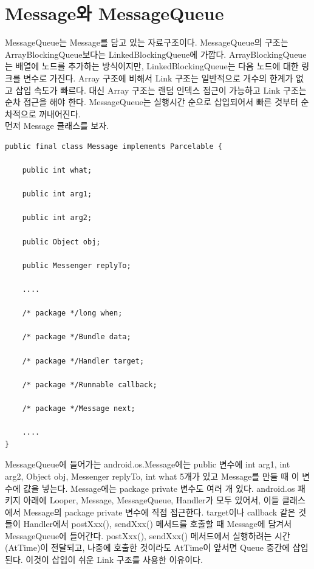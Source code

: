 \section{Message와 MessageQueue}
\label{sec:messagequeue}
MessageQueue는 Message를 담고 있는 자료구조이다.
MessageQueue의 구조는 ArrayBlockingQueue보다는 LinkedBlockingQueue에 가깝다. ArrayBlockingQueue는 배열에 노드를 추가하는 방식이지만, LinkedBlockingQueue는 다음 노드에 대한 링크를 변수로 가진다. 
Array 구조에 비해서 Link 구조는 일반적으로 개수의 한계가 없고 삽입 속도가 빠르다. 
대신 Array 구조는 랜덤 인덱스 접근이 가능하고 Link 구조는 순차 접근을 해야 한다. MessageQueue는 실행시간 순으로 삽입되어서 빠른 것부터 순차적으로 꺼내어진다.\\

먼저 Message 클래스를 보자.
\begin{lstlisting}[frame=single, caption=Message.java] 
public final class Message implements Parcelable {

	public int what;

	public int arg1;

	public int arg2;

	public Object obj;

	public Messenger replyTo;
	
	....

	/* package */long when;

	/* package */Bundle data;

	/* package */Handler target;

	/* package */Runnable callback;

	/* package */Message next;
	
	....
}
\end{lstlisting}
MessageQueue에 들어가는 android.os.Message에는 public 변수에 int arg1, int arg2, Object obj,
Messenger replyTo, int what 5개가 있고 Message를 만들 때 이 변수에 값을 넣는다.
Message에는 package private 변수도 여러 개 있다. android.os 패키지 아래에 Looper, Message, MessageQueue, Handler가 모두 있어서, 이들 클래스에서 Message의 package private 변수에 직접 접근한다. target이나 callback 같은 것들이 Handler에서 postXxx(), sendXxx() 메서드를 호출할 때 Message에 담겨서 MessageQueue에 들어간다. postXxx(), sendXxx() 메서드에서 실행하려는 시간(AtTime)이 전달되고, 나중에 호출한 것이라도 AtTime이 앞서면 Queue 중간에 삽입된다. 이것이 삽입이 쉬운 Link 구조를 사용한 이유이다.\\

